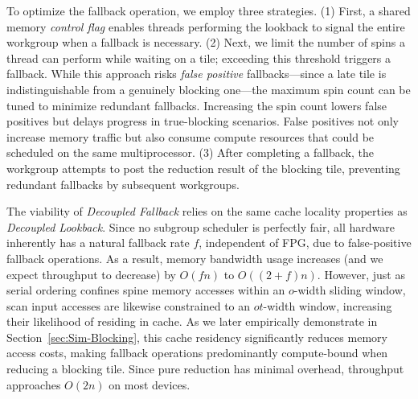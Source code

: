 \documentclass[acmsmall, manuscript, screen, review, anonymous]{acmart}
\begin{document}
To optimize the fallback operation, we employ three strategies. (1) First, a shared memory \emph{control flag} enables threads performing the lookback to signal the entire workgroup when a fallback is necessary. (2) Next, we limit the number of spins a thread can perform while waiting on a tile; exceeding this threshold triggers a fallback. While this approach risks \emph{false positive} fallbacks---since a late tile is indistinguishable from a genuinely blocking one---the maximum spin count can be tuned to minimize redundant fallbacks. Increasing the spin count lowers false positives but delays progress in true-blocking scenarios. False positives not only increase memory traffic but also consume compute resources that could be scheduled on the same multiprocessor. (3) After completing a fallback, the workgroup attempts to post the reduction result of the blocking tile, preventing redundant fallbacks by subsequent workgroups.

The viability of \emph{Decoupled Fallback} relies on the same cache locality properties as \emph{Decoupled Lookback}. Since no subgroup scheduler is perfectly fair, all hardware inherently has a natural fallback rate $f$\!, independent of FPG, due to false-positive fallback operations. As a result, memory bandwidth usage increases (and we expect throughput to decrease) by $O(fn)$ to $O((2 + f)n)$. However, just as serial ordering confines spine memory accesses within an $o$-width sliding window, scan input accesses are likewise constrained to an $ot$-width window, increasing their likelihood of residing in cache. As we later empirically demonstrate in Section~\ref{sec:Sim-Blocking}, this cache residency significantly reduces memory access costs, making fallback operations predominantly compute-bound when reducing a blocking tile. Since pure reduction has minimal overhead, throughput approaches $O(2n)$ on most devices.
\end{document}
